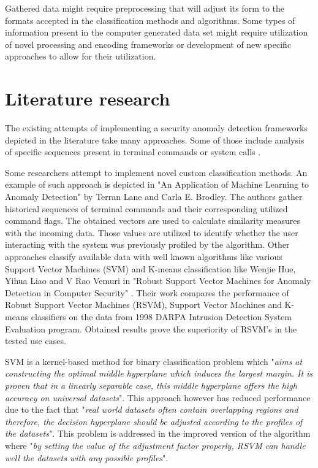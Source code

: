 \documentclass[a4paper,twoside,12pt]{book}
\begin{document}
Gathered data might require preprocessing that will adjust its form to the formats accepted in the
classification methods and algorithms. Some types of information present in the computer 
generated data set might require utilization of novel processing and encoding frameworks or 
development of new specific approaches to allow for their utilization.  

\section{Literature research}

The existing attempts of implementing a security anomaly detection frameworks depicted in the 
literature take many approaches. Some of those include analysis of specific sequences
present in terminal commands \cite{bib:lane1997application} or system calls \cite{bib:forest}. 

Some researchers attempt to implement novel custom classification methods. An example of such 
approach is depicted in "An Application of Machine Learning to Anomaly Detection" by Terran Lane 
and Carla E. Brodley\cite{bib:lane1997application}. The authors gather historical sequences of
terminal commands and their corresponding utilized command flags. The obtained vectors are used
to calculate similarity measures with the incoming data. Those values are utilized to identify 
whether the user interacting with the system was previously profiled by the algorithm.
Other approaches classify available data with well known algorithms like various Support Vector 
Machines (SVM) and K-means classification like Wenjie Hue, Yihua Liao and V Rao Vemuri in "Robust Support Vector 
Machines for Anomaly Detection in Computer Security" \cite{bib:rsvm}. Their work compares the 
performance of Robust Support Vector Machines (RSVM), Support Vector Machines and K-means classifiers
on the data from 1998 DARPA Intrusion Detection System Evaluation program. Obtained results
prove the superiority of RSVM's in the tested use cases. 

SVM is a kernel-based method for binary classification problem which "\textit{aims at constructing 
the optimal middle hyperplane which induces the largest margin. It is proven that in a linearly 
separable case, this middle hyperplane offers the high accuracy on universal datasets}". This 
approach however has reduced performance due to the fact that "\textit{real world datasets often contain 
overlapping regions and therefore, the decision hyperplane should be adjusted according to the 
profiles of the datasets}". This problem is addressed in the improved version of the algorithm
where "\textit{by setting the value of the adjustment factor properly, RSVM can handle well the datasets 
with any possible profiles}"\cite{bib:svmandrsvm}.
\end{document}
